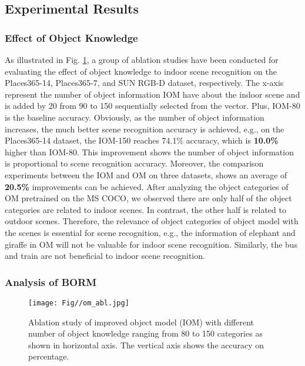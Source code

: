 \subsection{Experimental Results}
\subsubsection{Effect of Object Knowledge}
As illustrated in Fig. \ref{fig:om_ablation}, a group of ablation studies have been conducted for evaluating the effect of object knowledge to indoor scene recognition on the Places365-14, Places365-7, and SUN RGB-D dataset, respectively. The x-axis represent the number of object information IOM have about the indoor scene and is added by 20 from 90 to 150 sequentially selected from the vector. Plus, IOM-80 is the baseline accuracy. Obviously, as the number of object information increases, the much better scene recognition accuracy is achieved, e.g., on the Places365-14 dataset, the IOM-150 reaches 74.1\% accuracy, which is \textbf{10.0\%} higher than IOM-80. This improvement shows the number of object information is proportional to scene recognition accuracy. Moreover, the comparison experiments between the IOM and OM on three datasets, shows an average of \textbf{20.5\%} improvements can be achieved. After analyzing the object categories of OM pretrained on the MS COCO, we observed there are only half of the object categories are related to indoor scenes. In contrast, the other half is related to outdoor scenes. Therefore, the relevance of object categories of object model with the scenes is essential for scene recognition, e.g., the information of elephant and giraffe in OM will not be valuable for indoor scene recognition. Similarly, the bus and train are not beneficial to indoor scene recognition.

\subsubsection{{Analysis of BORM}}

\begin{figure}[tbp]
	\centering
	\texttt{[image: Fig//om\_abl.jpg]}
	\caption{Ablation study of improved object model (IOM) with different number of object knowledge ranging from 80 to 150 categories as shown in horizontal axis. The vertical axis shows the accuracy on percentage.}
	\label{fig:om_ablation}
\end{figure}

